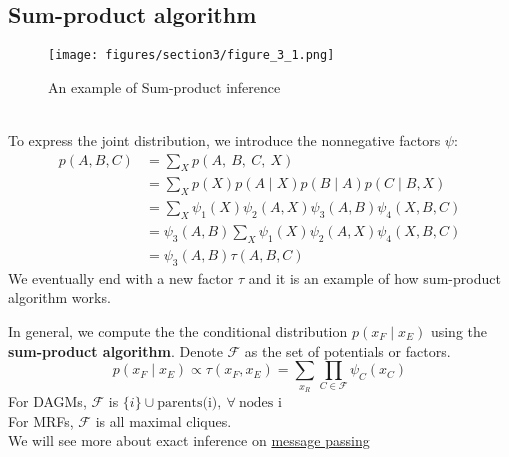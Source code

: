 \subsection{Sum-product algorithm}
\label{sec:sum-product}
\begin{example}
    \begin{figure}[H]
        \centering
        \texttt{[image: figures/section3/figure\_3\_1.png]}
        \caption{An example of Sum-product inference}
        \label{fig:sum-product}
    \end{figure}
    \text{}\\
    To express the joint distribution, we introduce the nonnegative factors $\psi$: 
    \begin{align*}
        p(A, B, C) & =\sum_X p(A,\:B,\:C,\:X)\\
        & =\sum_X p(X) p(A \mid X) p(B \mid A) p(C \mid B, X) \\
        & =\sum_X \psi_1(X) \psi_2(A, X) \psi_3(A, B) \psi_4(X, B, C) \\
        & =\psi_3(A, B) \sum_X \psi_1(X) \psi_2(A, X) \psi_4(X, B, C) \\
        & =\psi_3(A, B) \tau(A, B, C)
    \end{align*}
    We eventually end with a new factor $\tau$ and it is an example of how sum-product algorithm works.
\end{example}
In general, we compute the the conditional distribution $p(x_F\mid x_E)$ using the \textbf{sum-product algorithm}. Denote $\mathcal{F}$ as the set of potentials or factors.
$$p\left(x_F \mid x_E\right) \propto \tau\left(x_F, x_E\right)=\sum_{x_R} \prod_{C \in \mathcal{F}} \psi_C\left(x_C\right)$$
For DAGMs, $\mathcal{F}$ is $\{i\}\cup\text{parents(i)},\:\forall\:\text{nodes i}$\\
For MRFs, $\mathcal{F}$ is all maximal cliques.\\
\newline
We will see more about exact inference on \hyperref[sec:message-passing]{message passing}